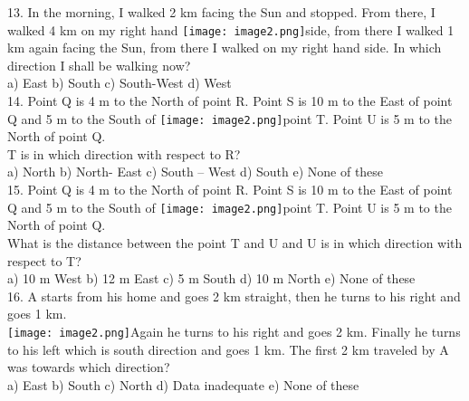 \documentclass[
]{article}
\begin{document}
13. In the morning, I walked 2 km facing the Sun and stopped. From there, I walked 4 km on
my right hand \texttt{[image: image2.png]}side, from there I walked 1 km again facing the Sun, from there I walked on
my right hand side. In which direction I shall be walking now?\\
a) East \hspace{2mm}b) South \hspace{2mm}c) South-West \hspace{2mm}d) West\\

14. Point Q is 4 m to the North of point R. Point S is 10 m to the East of point Q and 5 m to the
South of \texttt{[image: image2.png]}point T. Point U is 5 m to the North of point Q.\\
T is in which direction with respect to R?\\
a) North \hspace{2mm}b) North- East \hspace{2mm}c) South – West \hspace{2mm}d) South \hspace{2mm}e) None of these\\

15. Point Q is 4 m to the North of point R. Point S is 10 m to the East of point Q and 5 m to the
South of \texttt{[image: image2.png]}point T. Point U is 5 m to the North of point Q.\\
What is the distance between the point T and U and U is in which direction with respect to T?\\
a) 10 m West \hspace{2mm}b) 12 m East \hspace{2mm}c) 5 m South \hspace{2mm}d) 10 m North \hspace{2mm}e) None of these\\

16. A starts from his home and goes 2 km straight, then he turns to his right and goes 1 km.\\
\texttt{[image: image2.png]}Again he turns to his right and goes 2 km. Finally he turns to his left which is south
direction and goes 1 km. The first 2 km traveled by A was towards which direction?\\
a) East \hspace{2mm}b) South \hspace{2mm}c) North
\hspace{2mm}d) Data inadequate \hspace{2mm}e) None of these\\
\end{document}
